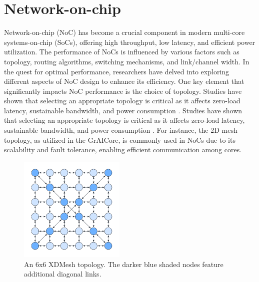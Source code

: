 \section{Network-on-chip}

Network-on-chip (NoC) has become a crucial component in modern multi-core systems-on-chip (SoCs), offering high throughput, low latency, and efficient power utilization.
The performance of NoCs is influenced by various factors such as topology, routing algorithms, switching mechanisms, and link/channel width.
In the quest for optimal performance, researchers have delved into exploring different aspects of NoC design to enhance its efficiency.
One key element that significantly impacts NoC performance is the choice of topology.
Studies have shown that selecting an appropriate topology is critical as it affects zero-load latency, sustainable bandwidth, and power consumption \cite{chenPhysicalVsVirtual2010}.
Studies have shown that selecting an appropriate topology is critical as it affects zero-load latency, sustainable bandwidth, and power consumption \cite{chen}.
For instance, the 2D mesh topology, as utilized in the GrAICore, is commonly used in NoCs due to its scalability and fault tolerance, enabling efficient communication among cores.

\begin{figure}[htbp]
\centering
\includegraphics[width=0.45\textwidth]{assets/xdmesh_topology.pdf}
\caption{
An 6x6 XDMesh topology.
The darker blue shaded nodes feature additional diagonal links.
}
\label{fig:xdmesh_topology}
\end{figure}

